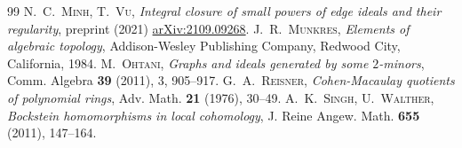 \documentclass[11pt,oneside]{amsart}
\theoremstyle{plain}
\theoremstyle{definition}
\newcommand{\rc}{\color{red}}
\begin{document}
\begin{thebibliography}{99}
 \textsc{N.~C.~Minh, T.~Vu}, \textit{Integral closure of small powers of edge ideals and their regularity}, preprint  (2021) \href{https://arxiv.org/abs/2109.09268}{arXiv:2109.09268}.
 \textsc{J.~R.~Munkres}, \textit{Elements of algebraic topology}, Addison-Wesley Publishing Company, Redwood City, California, 1984.
 \textsc{M.~Ohtani}, \textit{Graphs and ideals generated by some $2$-minors}, Comm. Algebra \textbf{39} (2011), 3, 905--917.
 \textsc{G.~A.~Reisner}, \textit{Cohen-Macaulay quotients of polynomial rings}, Adv. Math. \textbf{21} (1976), 30--49. 
 \textsc{A.~K.~Singh, U.~Walther}, \textit{Bockstein homomorphisms in local cohomology}, J. Reine Angew. Math. \textbf{655} (2011), 147--164.
\end{thebibliography}
\end{document}
